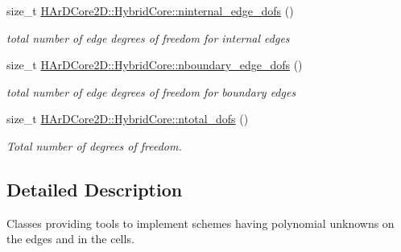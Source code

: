 \begin{DoxyCompactItemize}
size\+\_\+t \hyperlink{group__HybridCore2D_gae6e771ab58f248db8f051d47de982cf5}{H\+Ar\+D\+Core2\+D\+::\+Hybrid\+Core\+::ninternal\+\_\+edge\+\_\+dofs} ()
\begin{DoxyCompactList}\small\item\em total number of edge degrees of freedom for internal edges \end{DoxyCompactList}\item 
\mbox{\label{group__HybridCore2D_ga5fd63afc45211d3005f6e25682c533b2}} 
size\+\_\+t \hyperlink{group__HybridCore2D_ga5fd63afc45211d3005f6e25682c533b2}{H\+Ar\+D\+Core2\+D\+::\+Hybrid\+Core\+::nboundary\+\_\+edge\+\_\+dofs} ()
\begin{DoxyCompactList}\small\item\em total number of edge degrees of freedom for boundary edges \end{DoxyCompactList}\item 
\mbox{\label{group__HybridCore2D_ga728e5b5aa3675a64e7dbc593ed9761f8}} 
size\+\_\+t \hyperlink{group__HybridCore2D_ga728e5b5aa3675a64e7dbc593ed9761f8}{H\+Ar\+D\+Core2\+D\+::\+Hybrid\+Core\+::ntotal\+\_\+dofs} ()
\begin{DoxyCompactList}\small\item\em Total number of degrees of freedom. \end{DoxyCompactList}\end{DoxyCompactItemize}


\subsection{Detailed Description}
Classes providing tools to implement schemes having polynomial unknowns on the edges and in the cells. 

